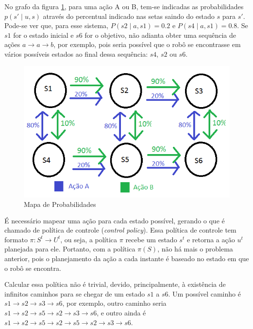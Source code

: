 No grafo da figura \ref{img:MapaDeProbabilidadesMarkov}, para uma ação A ou B, tem-se indicadas as probabilidades $ p \left( s' \mid u, s \right) $ através do percentual indicado nas setas saindo do estado $ s $ para $ s' $. Pode-se ver que, para esse sistema, $ P \left( s2 \mid a, s1 \right) = 0.2 $ e $ P \left( s4 \mid a, s1 \right) = 0.8 $. Se $ s1 $ for o estado inicial e $ s6 $ for o objetivo, não adianta obter uma sequência de ações $ a \rightarrow a \rightarrow b$, por exemplo, pois seria possível que o robô se encontrasse em vários possíveis estados ao final dessa sequência: $ s4 $, $ s2 $ ou $ s6 $.

\begin{figure}[h]
    \centering
    \includegraphics[width=120mm]{images/probabilidade-markov}
    \caption{Mapa de Probabilidades}
    \label{img:MapaDeProbabilidadesMarkov}
\end{figure}

É necessário mapear uma ação para cada estado possível, gerando o que é chamado de política de controle (\textit{control policy}). Essa política de controle tem formato $ \pi: S^t \rightarrow U^t $, ou seja, a política $ \pi $ recebe um estado $ s^t $ e retorna a ação $ u^t $ planejada para ele. Portanto, com a política $ \pi \left( S \right) $, não há mais o problema anterior, pois o planejamento da ação a cada instante é baseado no estado em que o robô se encontra.

Calcular essa política não é trivial, devido, principalmente, à existência de infinitos caminhos para se chegar de um estado $ s1 $ a $ s6 $. Um possível caminho é $ s1 \rightarrow s2 \rightarrow s3 \rightarrow s6 $, por exemplo, outro caminho seria $ s1 \rightarrow s2 \rightarrow s5 \rightarrow s2 \rightarrow s3 \rightarrow s6 $, e outro ainda é $ s1 \rightarrow s2 \rightarrow s5 \rightarrow s2 \rightarrow s5 \rightarrow s2 \rightarrow s3 \rightarrow s6 $.

